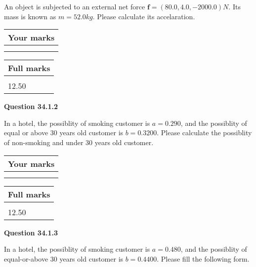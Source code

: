 \documentclass[12pt]{article}
\begin{document}
  
 
An object is subjected to an external net force $\mathbf{f}=(
80.0,  %
4.0,
-2000.0  )N$. Its mass is known as
$m= %
52.0 kg$. Please calculate its accelaration.
 
 

 

 
\vspace{0.3in}
  
\vspace{0.2in}
  
         \begin{tabular}{|l|}
\hline
 Your marks  \\
\hline
 \\ 
 \\ 
\hline
\end{tabular}
\hspace{0.05in} \begin{tabular}{|l|}
\hline
 Full marks  \\
\hline
 \\ 
12.50 \\
\hline
\end{tabular}
{\textbf{\Large{Question
34.1.2 
}}}
  
  
In a hotel, the possiblity of  %
smoking customer is
$a =  %
0.290$, and the possiblity of  %
equal or above 30 years old customer is $ b =  %
0.3200$.
Please calculate the possiblity of  %
 non-smoking and  %
under 30 years old customer.
 

 

 
\vspace{0.3in}
  
\vspace{0.2in}
  
         \begin{tabular}{|l|}
\hline
 Your marks  \\
\hline
 \\ 
 \\ 
\hline
\end{tabular}
\hspace{0.05in} \begin{tabular}{|l|}
\hline
 Full marks  \\
\hline
 \\ 
12.50 \\
\hline
\end{tabular}
{\textbf{\Large{Question
34.1.3 
}}}
  
  
In a hotel, the possiblity of  %
smoking customer is
$a =  %
0.480$, and the possiblity of  %
equal-or-above 30 years old customer is $ b =  %
0.4400$.
Please fill the following form.
 
\end{document}
